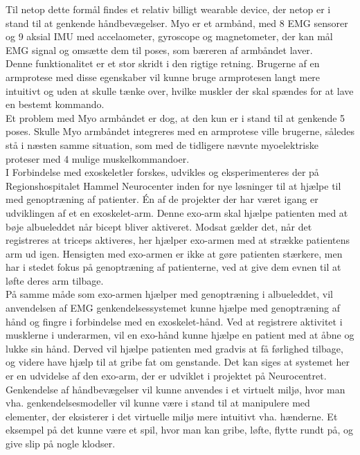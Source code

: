 Til netop dette formål findes et relativ billigt wearable device, der netop er i stand til at genkende håndbevægelser. Myo er et armbånd, med 8 EMG sensorer og 9 aksial IMU med accelaometer, gyroscope og magnetometer, der kan mål EMG signal og omsætte dem til poses, som bæreren af armbåndet laver. \\
Denne funktionalitet er et stor skridt i den rigtige retning. Brugerne af en armprotese med disse egenskaber vil kunne bruge armprotesen langt mere intuitivt og uden at skulle tænke over, hvilke muskler der skal spændes for at lave en bestemt kommando.\\
Et problem med Myo armbåndet er dog, at den kun er i stand til at genkende 5 poses. Skulle Myo armbåndet integreres med en armprotese ville brugerne, således stå i næsten samme situation, som med de tidligere nævnte myoelektriske proteser med 4 mulige muskelkommandoer.\\

I Forbindelse med exoskeletler forskes, udvikles og eksperimenteres der på Regionshospitalet Hammel Neurocenter inden for nye løsninger til at hjælpe til med genoptræning af patienter. Én af de projekter der har været igang er udviklingen af et en exoskelet-arm. Denne exo-arm skal hjælpe patienten med at bøje albueleddet når bicept bliver aktiveret. Modsat gælder det, når det registreres at triceps aktiveres, her hjælper exo-armen med at strække patientens arm ud igen. Hensigten med exo-armen er ikke at gøre patienten stærkere, men har i stedet fokus på genoptræning af patienterne, ved at give dem evnen til at løfte deres arm tilbage.\\

På samme måde som exo-armen hjælper med genoptræning i albueleddet, vil anvendelsen af EMG genkendelsessystemet kunne hjælpe med genoptræning af hånd og fingre i forbindelse med en exoskelet-hånd. Ved at registrere aktivitet i musklerne i underarmen, vil en exo-hånd kunne hjælpe en patient med at åbne og lukke sin hånd. Derved vil hjælpe patienten med gradvis at få førlighed tilbage, og videre have hjælp til at gribe fat om genstande. Det kan siges at systemet her er en udvidelse af den exo-arm, der er udviklet i projektet på Neurocentret. \\

Genkendelse af håndbevægelser vil kunne anvendes i et virtuelt miljø, hvor man vha.  genkendelsesmodeller vil kunne være i stand til at manipulere med elementer, der eksisterer i det virtuelle miljø mere intuitivt vha. hænderne. Et eksempel på det kunne være et spil, hvor man kan gribe, løfte, flytte rundt på, og give slip på nogle klodser.

